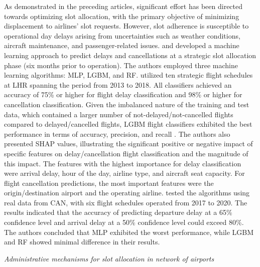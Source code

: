 As demonstrated in the preceding articles, significant effort has been directed
towards optimizing slot allocation, with the primary objective of minimizing
displacement to airlines’ slot requests.
%
However, slot adherence is susceptible to operational day delays arising from
uncertainties such as weather conditions, aircraft maintenance, and
passenger-related issues.
%
 and  
developed a machine learning approach to predict delays and cancellations at a
strategic slot allocation phase (six months prior to operation).
%
The authors employed three machine learning algorithms: \acrfull{MLP},
\acrfull{LGBM}, and \acrfull{RF}.
%
 utilized ten strategic flight schedules at
\acrfull{LHR} spanning the period from 2013 to 2018.
%
All classifiers achieved an accuracy of 75\% or higher for flight delay
classification and 98\% or higher for cancellation classification.
%
Given the imbalanced nature of the training and test data, which contained a
larger number of not-delayed/not-cancelled flights compared to delayed/cancelled
flights, \acrshort{LGBM} flight classifiers exhibited the best performance in
terms of accuracy, precision, and recall \cite{lambelho_assessing_2020}.
%
The authors also presented \acrfull{SHAP} values, illustrating the significant
positive or negative impact of specific features on delay/cancellation flight
classification and the magnitude of this impact.
%
The features with the highest importance for delay classification were arrival
delay, hour of the day, airline type, and aircraft seat capacity.
%
For flight cancellation predictions, the most important features were the
origin/destination airport and the operating airline.
%
 tested the algorithms using real data from
\acrfull{CAN}, with six flight schedules operated from 2017 to 2020.
%
The results indicated that the accuracy of predicting departure delay at a 65\%
confidence level and arrival delay at a 50\% confidence level could exceed 80\%.
%
The authors concluded that \acrshort{MLP} exhibited the worst performance, while
\acrshort{LGBM} and \acrshort{RF} showed minimal difference in their results.



\hfill \break
\textit{Administrative mechanisms for slot allocation in network of airports}
\hfill \break

